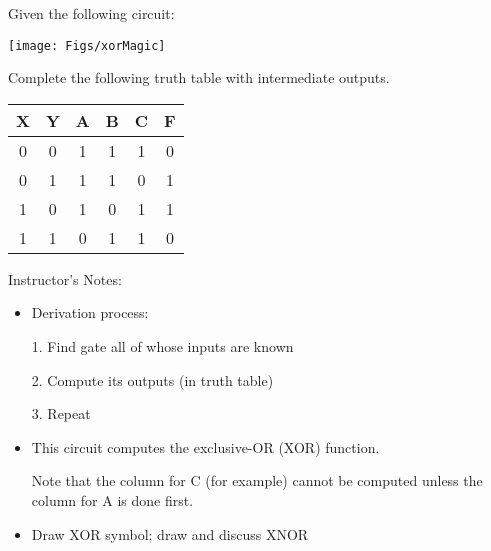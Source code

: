\ifnum{}
\begin{frame}[fragile]
\begin{tcolorbox}[enhanced,attach boxed title to top center={yshift=-3mm,yshifttext=-1mm},
  colback=red!5!white,colframe=red!75!black,colbacktitle=red!80!black,
  title=Try this,fonttitle=\bfseries,
  boxed title style={size=small,colframe=red!50!black} ]
  Given the following circuit:
  \begin{center}
      \texttt{[image: Figs/xorMagic]}
  \end{center}
  
  Complete the following truth table with intermediate outputs.
  \begin{center}\small
	\begin{tabular}{cc|ccc|c}
		X & Y & A & B & C & F\\
		\hline
		0 & 0 & 1 & 1&1&0\\
		0 & 1 & 1 & 1&0&1\\
		1 & 0 & 1 & 0&1&1\\
		1 & 1 & 0 & 1 &1&0\\
	\end{tabular}
	\end{center}
\end{tcolorbox}

\end{frame}
\BNotes\ifnum{}
\begin{frame}[fragile]
Instructor's Notes:
\begin{itemize}
\item Derivation process:

	1. Find gate all of whose inputs are known

	2. Compute its outputs (in truth table)

	3. Repeat
\item This circuit computes the exclusive-OR (XOR) function. 

	Note that the column for C (for example)
	cannot be computed unless the column for A is done first.
\item Draw XOR symbol; draw and discuss XNOR
\end{itemize}
\end{frame}
\fi\ENotes
\fi

